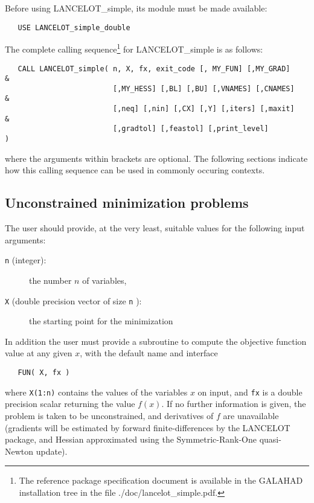\documentclass{article}
\begin{document}

Before using  {\sf LANCELOT\_simple}, its module must be made available:

\begin{lstlisting}
   USE LANCELOT_simple_double
\end{lstlisting}
\noindent
The complete calling sequence\footnote{The reference package
specification document is available
in the {\sf GALAHAD} installation tree in the file
./doc/lancelot\_simple.pdf.} for {\sf LANCELOT\_simple} is as follows:

\begin{lstlisting}
   CALL LANCELOT_simple( n, X, fx, exit_code [, MY_FUN] [,MY_GRAD]      &
                         [,MY_HESS] [,BL] [,BU] [,VNAMES] [,CNAMES]     &
                         [,neq] [,nin] [,CX] [,Y] [,iters] [,maxit]     &
                         [,gradtol] [,feastol] [,print_level]           )
\end{lstlisting}
\noindent
where the arguments within brackets are optional.
The following sections indicate how this calling sequence can
be used in commonly occuring contexts.

\subsection{Unconstrained minimization problems}

The user should provide, at the very least, suitable values for the
following input arguments:
\begin{description}
\item[{\tt n} (integer):] the number $n$ of variables,
\item[{\tt X} (double precision vector of size {\tt n} ):] the starting point
for the minimization
\end{description}
In addition the user must provide a subroutine to compute the objective
function value at any given $x$, with the default name and interface
\begin{lstlisting}
   FUN( X, fx )
\end{lstlisting}
\noindent
where {\tt X(1:n)} contains the values of the variables $x$ on input, and
{\tt fx} is a double precision scalar returning the value $f(x)$. If no
further information is given, the problem is taken to be unconstrained,
and derivatives of $f$ are unavailable (gradients will be estimated by forward
finite-differences by the {\sf LANCELOT} package, and Hessian approximated
using the Symmetric-Rank-One quasi-Newton update).
\end{document}
